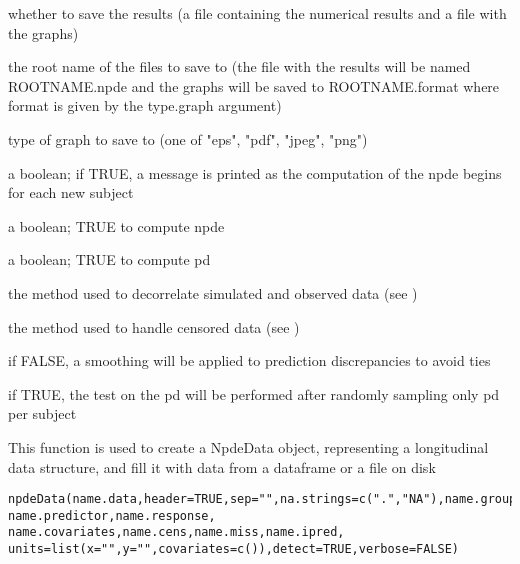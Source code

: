 \documentclass[a4paper]{book}
\begin{document}
\begin{Arguments}
\begin{ldescription}
\item[\code{boolsave}] whether to save the results (a file containing the numerical results and a file with the graphs)

\item[\code{namsav}] the root name of the files to save to (the file with the results will be named ROOTNAME.npde and the graphs will be saved to ROOTNAME.format where format is given by the type.graph argument)

\item[\code{type.graph}] type of graph to save to (one of "eps", "pdf", "jpeg", "png")

\item[\code{verbose}] a boolean; if TRUE, a message is printed as the computation of the npde begins for each new subject

\item[\code{calc.npde}] a boolean; TRUE to compute npde

\item[\code{calc.pd}] a boolean; TRUE to compute pd

\item[\code{decorr.method}] the method used to decorrelate simulated and observed data (see )

\item[\code{cens.method}] the method used to handle censored data (see )

\item[\code{ties}] if FALSE, a smoothing will be applied to prediction discrepancies to avoid ties

\item[\code{sample}] if TRUE, the test on the pd will be performed after randomly sampling only pd per subject
\end{ldescription}
\end{Arguments}
%
\begin{Description}\relax
This function is used to create a NpdeData object, representing a longitudinal data structure, and fill it with data from a dataframe or a file on disk
\end{Description}
%
\begin{Usage}
\begin{verbatim}
npdeData(name.data,header=TRUE,sep="",na.strings=c(".","NA"),name.group, name.predictor,name.response, name.covariates,name.cens,name.miss,name.ipred, units=list(x="",y="",covariates=c()),detect=TRUE,verbose=FALSE)
\end{verbatim}
\end{Usage}
\end{document}
